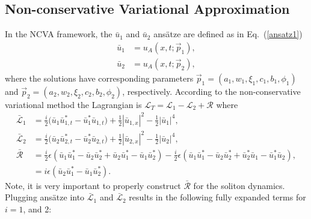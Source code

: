 \subsection{Non-conservative Variational Approximation} \label{section:NCVALL}
In the NCVA framework, the $\bar{u}_1$ and $\bar{u}_2$ ans\"{a}tze are defined as in Eq.~(\ref{ansatz1})
\begin{align}
\bar{u}_1 &= u_A(x,t; \vec{p}_1), \label{eq:psi1}\\
\bar{u}_2 &= u_A (x,t; \vec{p}_2), \label{eq:psi2}
\end{align}
where the solutions have corresponding parameters $\vec{p}_1 = (a_1, w_1, \xi_1,c_1, b_1, \phi_1)$ and $\vec{p}_2 = (a_2, w_2, \xi_2,c_2, b_2, \phi_2)$, respectively.
According to the non-conservative variational method the Lagrangian is $\mathcal{L}_T = \mathcal{L}_1 -\mathcal{L}_2 + \mathcal{R}$ where 
\begin{align}
\bar{\mathcal{L}}_1 &= \frac{i}{2} \Big(\bar{u}_1 \bar{u}_{1,t}^* - \bar{u}_1^* \bar{u}_{1,t}\Big) + \frac{1}{2} |\bar{u}_{1,x}|^2 - \frac{1}{2}|\bar{u}_1|^4, \nonumber \\
\bar{\mathcal{L}}_2 &= \frac{i}{2} \Big(\bar{u}_2 \bar{u}_{2,t}^* - \bar{u}_2^* \bar{u}_{2,t}\Big) + \frac{1}{2} |\bar{u}_{2,x}|^2 - \frac{1}{2}|\bar{u}_2|^4, \nonumber \\
\bar{\mathcal{R}} &= \frac{i}{2} \epsilon (\bar{u}_1\bar{u}_1^* - \bar{u}_2 \bar{u}_2^* + \bar{u}_2\bar{u}_1^* - \bar{u}_1 \bar{u}_2^*) - \frac{i}{2} \epsilon (\bar{u}_1\bar{u}_1^* - \bar{u}_2 \bar{u}_2^* + \bar{u}_2^*\bar{u}_1 - \bar{u}_1^* \bar{u}_2), \nonumber\\
 &=  i \epsilon (\bar{u}_2\bar{u}_1^* - \bar{u}_1 \bar{u}_2^* ). \nonumber 
\end{align}
Note, it is very important to properly construct $\bar{\mathcal{R}}$ for the soliton dynamics.  Plugging ans\"{a}tze into $\bar{\mathcal{L}}_1$ and $\bar{\mathcal{L}}_2$ results in the following fully expanded terms for $i = 1$, and 2:
